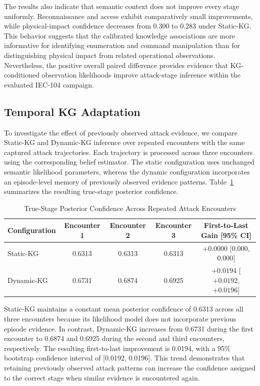 \documentclass[10pt,conference]{IEEEtran}
\begin{document}
The results also indicate that semantic context does not improve every stage uniformly. Reconnaissance and access exhibit comparatively small improvements, while physical-impact confidence decreases from 0.300 to 0.283 under Static-KG. This behavior suggests that the calibrated knowledge associations are more informative for identifying enumeration and command manipulation than for distinguishing physical impact from related operational observations. Nevertheless, the positive overall paired difference provides evidence that KG-conditioned observation likelihoods improve attack-stage inference within the evaluated IEC-104 campaign.

\subsection{Temporal KG Adaptation}

To investigate the effect of previously observed attack evidence, we compare Static-KG and Dynamic-KG inference over repeated encounters with the same captured attack trajectories. Each trajectory is processed across three encounters using the corresponding belief estimator. The static configuration uses unchanged semantic likelihood parameters, whereas the dynamic configuration incorporates an episode-level memory of previously observed evidence patterns. Table~\ref{tab:h2_temporal_results} summarizes the resulting true-stage posterior confidence.

\begin{table}[t]
\centering
\caption{True-Stage Posterior Confidence Across Repeated Attack Encounters}
\label{tab:h2_temporal_results}
\footnotesize
\begin{tabular}{lcccc}
\hline
\textbf{Configuration} & \textbf{Encounter 1} &
\textbf{Encounter 2} & \textbf{Encounter 3} &
\textbf{First-to-Last Gain [95\% CI]} \\
\hline
Static-KG & 0.6313 & 0.6313 & 0.6313 &
$+0.0000$ [$0.000$, $0.000$] \\
Dynamic-KG & 0.6731 & 0.6874 & 0.6925 &
$\mathbf{+0.0194}$ [$+0.0192$, $+0.0196$] \\
\hline
\end{tabular}
\end{table}

Static-KG maintains a constant mean posterior confidence of 0.6313 across all three encounters because its likelihood model does not incorporate previous episode evidence. In contrast, Dynamic-KG increases from 0.6731 during the first encounter to 0.6874 and 0.6925 during the second and third encounters, respectively. The resulting first-to-last improvement is 0.0194, with a 95\% bootstrap confidence interval of [0.0192, 0.0196]. This trend demonstrates that retaining previously observed attack patterns can increase the confidence assigned to the correct stage when similar evidence is encountered again.
\end{document}
